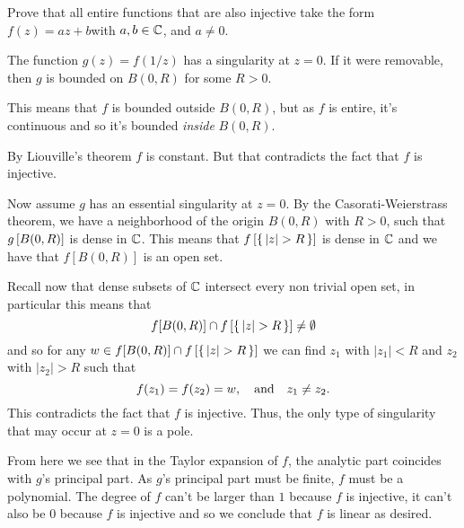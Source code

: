 \documentclass[12pt]{memoir}
\begin{document}
\begin{Ej}
    Prove that all entire functions that are also injective take the form $f (z) = az + b $with $a, b \in\mathbb{C}$, and $a \neq 0$. 
\end{Ej}

\begin{ptcbr}
The function $g(z)=f(1/z)$ has a singularity at $z=0$. If it were removable, then $g$ is bounded on $B(0,R)$ for some $R>0$.\par 
This means that $f$ is bounded outside $B(0,R)$, but as $f$ is entire, it's continuous and so it's bounded \emph{inside} $B(0,R)$.\par 
By Liouville's theorem $f$ is constant. But that contradicts the fact that $f$ is injective.\par 
Now assume $g$ has an essential singularity at $z=0$. By the Casorati-Weierstrass theorem, we have a neighborhood of the origin $B(0,R)$ with $R>0$, such that $g\left\lbrack B(0,R)\right\rbrack$ is dense in $\mathbb{C}$. This means that $f\bonj{\set{|z|>R}}$ is dense in $\mathbb{C}$ and we have that $f[B(0,R)]$ is an open set.\par 
Recall now that dense subsets of $\mathbb{C}$ intersect every non trivial open set, in particular this means that
$$f[B(0,R)]\cap f\bonj{\set{|z|>R}}\neq \emptyset$$
and so for any $w\in f[B(0,R)]\cap f\bonj{\set{|z|>R}}$ we can find $z_1$ with $|z_1|<R$ and $z_2$ with $|z_2|>R$ such that
$$f(z_1)=f(z_2)=w,\quad\text{and}\quad z_1\neq z_2.$$
This contradicts the fact that $f$ is injective. Thus, the only type of singularity that may occur at $z=0$ is a pole.\par 
From here we see that in the Taylor expansion of $f$, the analytic part coincides with $g$'s principal part. As $g$'s principal part must be finite, $f$ must be a polynomial. The degree of $f$ can't be larger than $1$ because $f$ is injective, it can't also be $0$ because $f$ is injective and so we conclude that $f$ is linear as desired.
\end{ptcbr}
\end{document}
